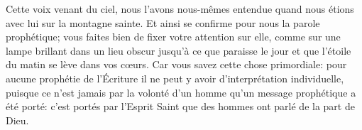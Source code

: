 Cette voix venant du ciel, nous l’avons nous-mêmes entendue
	quand nous étions avec lui sur la montagne sainte.
Et ainsi se confirme pour nous la parole prophétique;
	vous faites bien de fixer votre attention sur elle,
	comme sur une lampe brillant dans un lieu obscur
		jusqu’à ce que paraisse le jour
	et que l’étoile du matin se lève dans vos cœurs.
Car vous savez cette chose primordiale:
	pour aucune prophétie de l’Écriture
		il ne peut y avoir d’interprétation individuelle,
	puisque ce n’est jamais par la volonté d’un homme
		qu’un message prophétique a été porté:
	c’est portés par l’Esprit Saint que des hommes ont parlé de la part de Dieu.